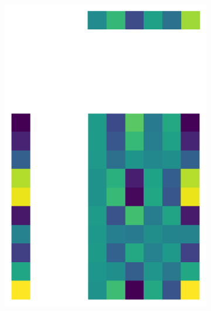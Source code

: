 \documentclass[10pt,twocolumn]{article}
\begin{document}
\begin{figure}[H]
\begin{subfigure}[t]{.15\textwidth}
\centering
\includegraphics[scale=.2]{random-matrix-reconstruction-PCs-1.png}
\caption{ }
\end{subfigure}
\begin{subfigure}[t]{.15\textwidth}
\centering

\end{subfigure}
\end{figure}
\end{document}
